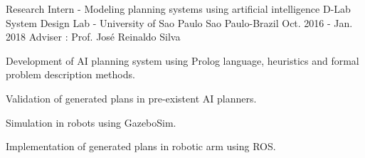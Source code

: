 


\begin{cventries}


\cventry
{Research Intern - Modeling planning systems using artificial intelligence} %
{D-Lab System Design Lab - University of Sao Paulo } %
{Sao Paulo-Brazil} %
{Oct. 2016 -  Jan. 2018} %
{Adviser : Prof. José Reinaldo Silva}
{ %
\begin{cvitems}
\item {Development of AI planning system using Prolog language, heuristics and formal problem description methods.}
\item {Validation of generated plans in pre-existent AI planners.}
\item {Simulation in robots using GazeboSim.}
\item {Implementation of generated plans in robotic arm using ROS.}
\end{cvitems}
}

\vspace*{5mm}




\end{cventries}
